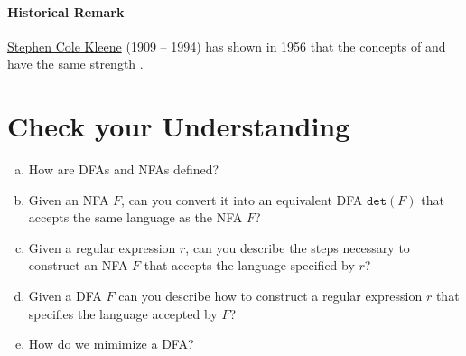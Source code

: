 \paragraph{Historical Remark}
\href{http://en.wikipedia.org/wiki/Stephen_Cole_Kleene}{Stephen Cole Kleene} (1909 -- 1994) has shown in 1956 that the concepts of 
 and  have the same strength
\cite{kleene:1956}.

\section{Check your Understanding}
\begin{enumerate}[(a)]
\item How are \textsc{DFA}s and \textsc{NFA}s defined?
\item Given an \textsc{NFA} $F$, can you convert it into an equivalent \textsc{DFA}
      $\mathtt{det}(F)$ that accepts the same language as the \textsc{NFA} $F$?
\item Given a regular expression $r$, can you describe the steps necessary to construct an 
      \textsc{NFA} $F$ that accepts the language specified by $r$?
\item Given a \textsc{DFA} $F$ can you describe how to construct a regular expression $r$
      that specifies the language accepted by $F$?
\item How do we mimimize a \textsc{DFA}?
\end{enumerate}

